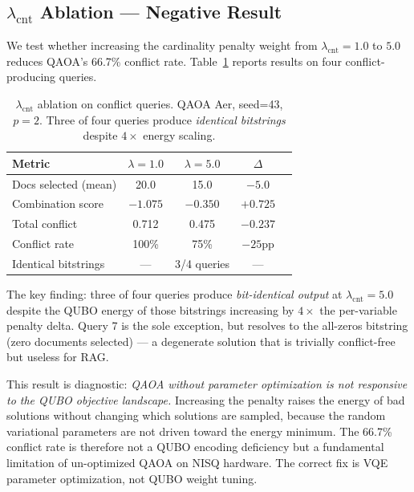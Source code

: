 \documentclass{article}
\begin{document}
\subsection{\texorpdfstring{$\lambda_{\text{cnt}}$}{lambda\_cnt} Ablation --- Negative Result}

We test whether increasing the cardinality penalty weight from
$\lambda_{\text{cnt}} = 1.0$ to $5.0$ reduces QAOA's 66.7\% conflict
rate. Table~\ref{tab:ablation} reports results on four
conflict-producing queries.

\begin{table}[h]
\centering
\caption{$\lambda_{\text{cnt}}$ ablation on conflict queries.
QAOA Aer, seed=43, $p=2$. Three of four queries produce
\emph{identical bitstrings} despite $4\times$ energy scaling.}
\label{tab:ablation}
\small
\begin{tabular}{lcccc}
\toprule
Metric & $\lambda=1.0$ & $\lambda=5.0$ & $\Delta$ \\
\midrule
Docs selected (mean) & 20.0 & 15.0 & $-5.0$ \\
Combination score & $-1.075$ & $-0.350$ & $+0.725$ \\
Total conflict & 0.712 & 0.475 & $-0.237$ \\
Conflict rate & 100\% & 75\% & $-25$pp \\
Identical bitstrings & — & 3/4 queries & — \\
\bottomrule
\end{tabular}
\end{table}

The key finding: three of four queries produce \emph{bit-identical
output} at $\lambda_{\text{cnt}} = 5.0$ despite the QUBO energy of
those bitstrings increasing by $4\times$ the per-variable penalty delta.
Query 7 is the sole exception, but resolves to the all-zeros bitstring
(zero documents selected) — a degenerate solution that is
trivially conflict-free but useless for RAG.

This result is diagnostic: \emph{QAOA without parameter optimization is
not responsive to the QUBO objective landscape.} Increasing the penalty
raises the energy of bad solutions without changing which solutions are
sampled, because the random variational parameters are not driven toward
the energy minimum. The 66.7\% conflict rate is therefore not a QUBO
encoding deficiency but a fundamental limitation of un-optimized QAOA
on NISQ hardware. The correct fix is VQE parameter optimization, not
QUBO weight tuning.

\end{document}
